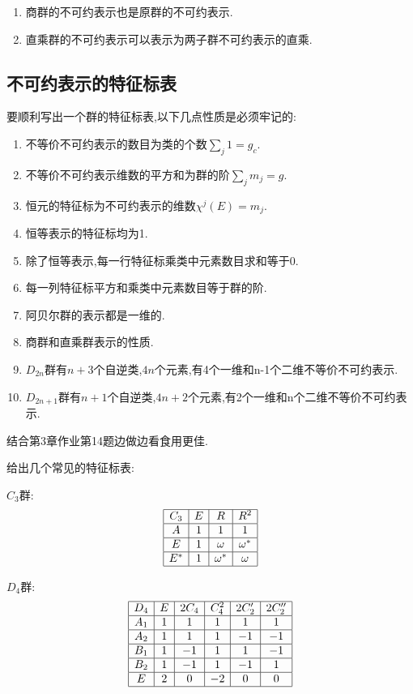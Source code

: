 \documentclass{ctexart}
\begin{document}
\begin{enumerate}
    \item 商群的不可约表示也是原群的不可约表示.
    \item 直乘群的不可约表示可以表示为两子群不可约表示的直乘.
\end{enumerate}

\subsection{不可约表示的特征标表}

要顺利写出一个群的特征标表,以下几点性质是必须牢记的:
\begin{enumerate}
    \item 不等价不可约表示的数目为类的个数$\sum_{j}1=g_{c}$.
    \item 不等价不可约表示维数的平方和为群的阶$\sum_{j}m_{j}=g$.
    \item 恒元的特征标为不可约表示的维数$\chi^{j}(E)=m_{j}$.
    \item 恒等表示的特征标均为1.
    \item 除了恒等表示,每一行特征标乘类中元素数目求和等于0.
    \item 每一列特征标平方和乘类中元素数目等于群的阶.
    \item 阿贝尔群的表示都是一维的.
    \item 商群和直乘群表示的性质.
    \item $D_{2n}$群有$n+3$个自逆类,$4n$个元素,有4个一维和n-1个二维不等价不可约表示.
    \item $D_{2n+1}$群有$n+1$个自逆类,$4n+2$个元素,有2个一维和n个二维不等价不可约表示.
\end{enumerate}

结合第3章作业第14题边做边看食用更佳.

给出几个常见的特征标表:

$C_{3}$群:
\[
\begin{array}{|c|c|c|c|}
\hline
C_{3} & E & R & R^{2} \\
\hline
A & 1 & 1 & 1 \\
\hline
E & 1 & \omega & \omega^{*} \\
\hline
E^{*} & 1 & \omega^{*} & \omega \\
\hline
\end{array}
\]

$D_{4}$群:
\[
\begin{array}{|c|c|c|c|c|c|}
\hline
D_{4}  & E & 2C_{4} & C_{4}^{2} & 2C_{2}' & 2C_{2}'' \\
\hline
A_{1} &1&1&1&1&1\\
\hline
A_{2} &1&1&1&-1&-1\\
\hline
B_{1} &1&-1&1&1&-1\\
\hline
B_{2} &1&-1&1&-1&1\\
\hline
E     &2&0&-2&0&0\\
\hline
\end{array}
\]
\end{document}
